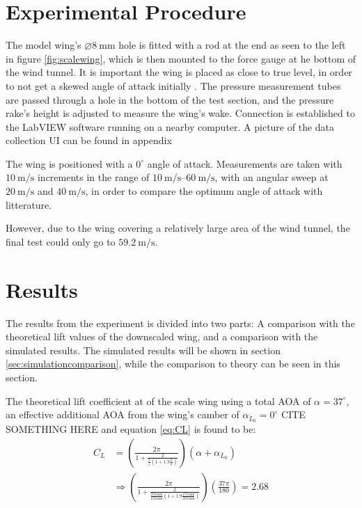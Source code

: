 \section{Experimental Procedure}

  The model wing's $\diameter\SI{8}{\milli\metre}$ hole is fitted with a rod at the end as seen to the left in figure \ref{fig:scalewing}, which is then mounted to the force gauge at he bottom of the wind tunnel. It is important the wing is placed as close to true level, in order to not get a skewed angle of attack initially \cite{truelevel}. The pressure measurement tubes are passed through a hole in the bottom of the test section, and the pressure rake's height is adjusted to measure the wing's wake. Connection is established to the LabVIEW software running on a nearby computer. A picture of the data collection UI can be found in appendix %

  The wing is positioned with a $0^\circ$ angle of attack. Measurements are taken with $\SI{10}{\metre\per\second}$ increments in the range of $\SIrange{10}{60}{\metre\per\second}$, with an angular sweep at $\SI{20}{\metre\per\second}$ and $\SI{40}{\metre\per\second}$, in order to compare the optimum angle of attack with litterature.

  However, due to the wing covering a relatively large area of the wind tunnel, the final test could only go to $\SI{59.2}{\metre\per\second}$.


\section{Results}

  The results from the experiment is divided into two parts: A comparison with the theoretical lift values of the downscaled wing, and a comparison with the simulated results. The simulated results will be shown in section \ref{sec:simulationcomparison}, while the comparison to theory can be seen in this section.

  The theoretical lift coefficient at of the scale wing using a total AOA of $\alpha = 37^\circ$, an effective additional AOA from the wing's camber of $\alpha_{L_0} = 0^\circ$ CITE SOMETHING HERE and equation \ref{eq:CL} is found to be:
  \begin{align*}
    C_L &= \left(\frac{2\pi}{1+\frac{2}{\frac{b}{c}\left(1+1.9\frac{h}{b}\right)}}\right)\left(\alpha + \alpha_{L_0}\right)\\
    &\Rightarrow
    \left(\frac{2\pi}{1+\frac{2}{\frac{\SI{250}{\milli\metre}}{\SI{150}{\milli\metre}}\left(1+1.9\frac{\SI{175}{\milli\metre}}{\SI{250}{\milli\metre}}\right)}}\right)\left(\frac{37\pi}{180}\right) = 2.68
  \end{align*}

